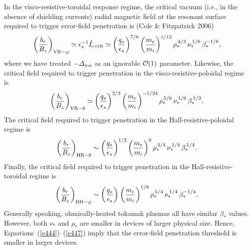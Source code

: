 \documentclass[notitlepage,12pt]{article}
\begin{document}
In the visco-resistive-toroidal response regime, the critical vacuum (i.e., in the absence of shielding currents) radial magnetic
field at the resonant surface required to
trigger error-field penetration is (Cole \& Fitzpatrick 2006)
\begin{equation}\label{e444}
\left(\frac{b_{r}}{B_z}\right)_{{\rm VR}-\varphi} \simeq \epsilon_s^{-1}\tilde{I}_{c\,{\rm crit}}\simeq \left(\frac{q_s}{\epsilon_s}\right)^{7/6}\left(\frac{m_e}{m_i}\right)^{1/12}
\rho_\ast^{\,4/3}\,\nu_\ast^{\,1/6}\,\beta_\ast^{-1/6},
\end{equation}
where we have treated $-{\mit\Delta}_{nw}$ as an ignorable ${\cal O}(1)$ parameter. Likewise,  the critical
field required to trigger penetration in the visco-resistive-poloidal regime is
\begin{equation}
\left(\frac{b_{r}}{B_z}\right)_{{\rm VR}-\theta} \simeq  \left(\frac{q_s}{\epsilon_s}\right)^{2/3}\left(\frac{m_e}{m_i}\right)^{-1/24}
\rho_\ast^{\,5/6}\,\nu_\ast^{\,1/6}\,\beta_\ast^{\,1/3}.
\end{equation}
The critical field required to trigger penetration in the Hall-resistive-poloidal regime is
\begin{equation}
\left(\frac{b_{r}}{B_z}\right)_{{\rm HR}-\theta} \sim  \left(\frac{q_s}{\epsilon_s}\right)^{1/2}\left(\frac{m_e}{m_i}\right)^{0}
\rho_\ast^{\,3/4}\,\nu_\ast^{\,1/4}\,\beta_\ast^{\,1/4}.
\end{equation}
Finally, the critical field 
required to  trigger penetration in the Hall-resistive-toroidal regime is
\begin{equation}
\left(\frac{b_{r}}{B_z}\right)_{{\rm HR}-\varphi} \sim  \left(\frac{q_s}{\epsilon_s}\right)^{}\left(\frac{m_e}{m_i}\right)^{1/8}
\rho_\ast^{\,5/4}\,\nu_\ast^{\,1/4}\,\beta_\ast^{-1/4}.\label{e447}
\end{equation}
Generally speaking, ohmically-heated tokamak plasmas all  have similar $\beta_\ast$ values. However,
both $\nu_\ast$ and $\rho_\ast$ are smaller in devices of larger physical size. Hence, Equations~(\ref{e444})--(\ref{e447})
imply that the error-field penetration threshold is smaller in larger devices. 
\end{document}
